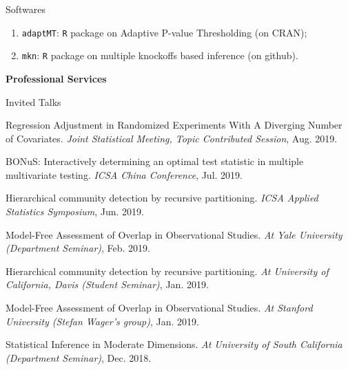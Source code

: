 \documentclass{article}
\begin{document}
\begin{large}
\noindent Softwares 
\end{large}

\begin{enumerate}
\item \texttt{adaptMT}: \texttt{R} package on Adaptive P-value Thresholding (on CRAN); 
\item \texttt{mkn}: \texttt{R} package on multiple knockoffs based inference (on github).
\end{enumerate}

\vspace{2mm}
\begin{large}
\noindent \textbf{Professional Services}
\end{large}
\vspace{5mm}

\begin{large}
\noindent Invited Talks
\end{large}

\vspace{2mm}
Regression Adjustment in Randomized Experiments With A Diverging Number of Covariates. \emph{Joint Statistical Meeting, Topic Contributed Session}, Aug. 2019.

\vspace{2mm}
BONuS: Interactively determining an optimal test statistic in multiple multivariate testing. \emph{ICSA China Conference}, Jul. 2019.

\vspace{2mm}
Hierarchical community detection by recursive partitioning. \emph{ICSA Applied Statistics Symposium}, Jun. 2019.

\vspace{2mm}
Model-Free Assessment of Overlap in Observational Studies. \emph{At Yale University (Department Seminar)}, Feb. 2019.

\vspace{2mm}
Hierarchical community detection by recursive partitioning. \emph{At University of California, Davis (Student Seminar)}, Jan. 2019.

\vspace{2mm}
Model-Free Assessment of Overlap in Observational Studies. \emph{At Stanford University (Stefan Wager's group)}, Jan. 2019.

\vspace{2mm}
Statistical Inference in Moderate Dimensions. \emph{At University of South California (Department Seminar)}, Dec. 2018.
\end{document}
